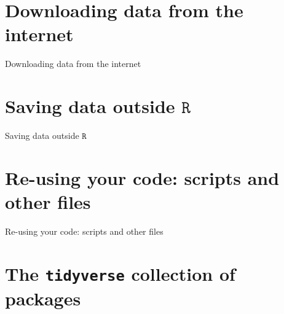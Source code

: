 \documentclass[
  11pt,
  ignorenonframetext,
]{beamer}
\newcommand{\R}{\texttt{R}}
\begin{document}
\hypertarget{downloading-data-from-the-internet}{%
\section{Downloading data from the
internet}\label{downloading-data-from-the-internet}}

\begin{frame}{Downloading data from the internet}
\end{frame}

\hypertarget{saving-data-outside-r}{%
\section{\texorpdfstring{Saving data outside
\(\R\)}{Saving data outside \textbackslash R}}\label{saving-data-outside-r}}

\begin{frame}{Saving data outside \(\R\)}
\end{frame}

\hypertarget{re-using-your-code-scripts-and-other-files}{%
\section{Re-using your code: scripts and other
files}\label{re-using-your-code-scripts-and-other-files}}

\begin{frame}{Re-using your code: scripts and other files}
\end{frame}

\hypertarget{the-tidyverse-collection-of-packages}{%
\section{\texorpdfstring{The \texttt{tidyverse} collection of
packages}{The tidyverse collection of packages}}\label{the-tidyverse-collection-of-packages}}
\end{document}
